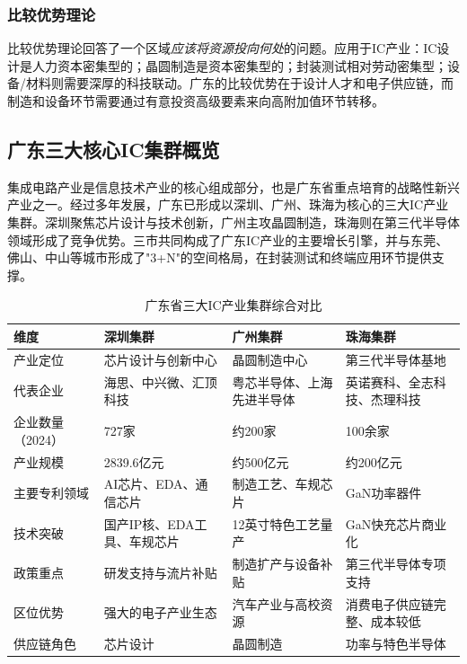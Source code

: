 \documentclass[12pt,a4paper]{article}
\newcommand{\tableHeaderRow}{\rowcolor{tealPrimary}\color{white}}
\newcommand{\tableOddRow}{\rowcolor{mintBG}}
\newcommand{\tableEvenRow}{\rowcolor{white}}
\begin{document}
\subsubsection{比较优势理论}

比较优势理论回答了一个区域\textit{应该将资源投向何处}的问题。应用于IC产业：IC设计是人力资本密集型的；晶圆制造是资本密集型的；封装测试相对劳动密集型；设备/材料则需要深厚的科技联动。广东的比较优势在于设计人才和电子供应链，而制造和设备环节需要通过有意投资高级要素来向高附加值环节转移。

\subsection{广东三大核心IC集群概览}
\label{sec:cluster_overview}

集成电路产业是信息技术产业的核心组成部分，也是广东省重点培育的战略性新兴产业之一。经过多年发展，广东已形成以深圳、广州、珠海为核心的三大IC产业集群。深圳聚焦芯片设计与技术创新，广州主攻晶圆制造，珠海则在第三代半导体领域形成了竞争优势。三市共同构成了广东IC产业的主要增长引擎，并与东莞、佛山、中山等城市形成了"3+N"的空间格局，在封装测试和终端应用环节提供支撑。

\begin{table}[H]
\centering
\small
\caption{广东省三大IC产业集群综合对比}
\label{tab:three_clusters}
\begin{tabular}{p{2.5cm}p{3.5cm}p{3.5cm}p{3.5cm}}
\toprule
\tableHeaderRow
\textbf{维度} & \textbf{深圳集群} & \textbf{广州集群} & \textbf{珠海集群} \\
\midrule
\tableOddRow 产业定位 & 芯片设计与创新中心 & 晶圆制造中心 & 第三代半导体基地 \\
\tableEvenRow 代表企业 & 海思、中兴微、汇顶科技 & 粤芯半导体、上海先进半导体 & 英诺赛科、全志科技、杰理科技 \\
\tableOddRow 企业数量（2024） & 727家 & 约200家 & 100余家 \\
\tableEvenRow 产业规模 & 2839.6亿元 & 约500亿元 & 约200亿元 \\
\tableOddRow 主要专利领域 & AI芯片、EDA、通信芯片 & 制造工艺、车规芯片 & GaN功率器件 \\
\tableEvenRow 技术突破 & 国产IP核、EDA工具、车规芯片 & 12英寸特色工艺量产 & GaN快充芯片商业化 \\
\tableOddRow 政策重点 & 研发支持与流片补贴 & 制造扩产与设备补贴 & 第三代半导体专项支持 \\
\tableEvenRow 区位优势 & 强大的电子产业生态 & 汽车产业与高校资源 & 消费电子供应链完整、成本较低 \\
\tableOddRow 供应链角色 & 芯片设计 & 晶圆制造 & 功率与特色半导体 \\
\bottomrule
\end{tabular}
\end{table}
\end{document}
